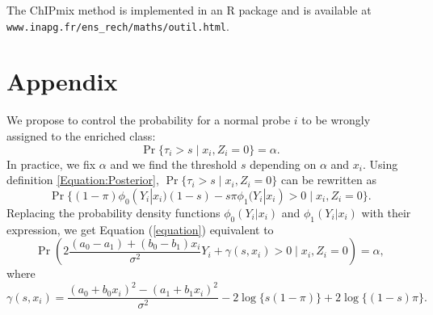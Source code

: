 \documentclass{llncs}
\begin{document}
The ChIPmix method is implemented in an R package and is available at\\
{\tt www.inapg.fr/ens\_rech/maths/outil.html}.




%
%


\section{Appendix}\label{append}
We propose to control the probability for a normal probe $i$ to be
wrongly assigned to the enriched class:
\begin{equation}\label{equation}
\Pr\{\tau_{i} > s \;|\; x_i, Z_i =0\}=\alpha.
\end{equation}
In practice, we fix $\alpha$ and we find the threshold $s$ depending
on $\alpha$ and $x_i$. Using definition \ref{Equation:Posterior},
$\Pr\{\tau_{i} > s \;|\; x_i, Z_i =0\}$ can be rewritten as
\begin{equation*}
\Pr\{ (1-\pi) \phi_0(Y_i|x_i) (1-s) - s \pi \phi_1(Y_i|x_i) > 0
\;|\; x_i, Z_i =0\}.
\end{equation*}
Replacing the probability density functions $\phi_0(Y_i|x_i)$ and
$\phi_1(Y_i|x_i)$ with their expression, we get Equation
(\ref{equation}) equivalent to
\begin{equation}\label{exp1}
\Pr\left(2\frac{(a_0-a_1)+(b_0-b_1)x_i}{\sigma^{2}}Y_{i} +
\gamma(s,x_i) > 0 \;|\; x_i,Z_i=0\right)=\alpha,
\end{equation}
where $$\gamma(s,x_i)=
\frac{(a_0+b_0x_i)^{2}-(a_1+b_1x_i)^{2}}{\sigma^2} -2\log
\{s(1-\pi)\} + 2\log \{(1-s)\pi\}.$$
\end{document}
